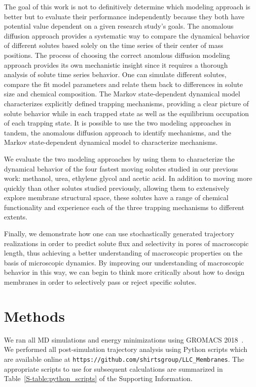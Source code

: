 \documentclass[journal=jctcce,manuscript=article]{achemso}
\begin{document}
  The goal of this work is not to definitively determine which modeling
  approach is better but to evaluate their performance independently because
  they both have potential value dependent on a given research study's goals.
  The anomalous diffusion approach provides a systematic way to compare the
  dynamical behavior of different solutes based solely on the time series of 
  their center of mass positions. The process of choosing the correct anomlous
  diffusion modeling approach provides its own mechanistic insight since it 
  requires a thorough analysis of solute time series behavior. One can simulate
  different solutes, compare the fit model parameters and relate them back to 
  differences in solute size and chemical composition. The Markov state-dependent
  dynamical model characterizes explicitly defined trapping mechanisms,
  providing a clear picture of solute behavior while in each trapped state as
  well as the equilibrium occupation of each trapping state.  It is possible to
  use the two modeling approaches in tandem, the anomalous diffusion approach to
  identify mechanisms, and the Markov state-dependent dynamical model to 
  characterize mechanisms. 
  
  We evaluate the two modeling approaches by using them to characterize the
  dynamical behavior of the four fastest moving solutes studied in our previous
  work: methanol, urea, ethylene glycol and acetic acid. In addition to moving
  more quickly than other solutes studied previously, allowing them to extensively
  explore membrane structural space, these solutes have a range of chemical 
  functionality and experience each of the three trapping mechanisms to different extents.
  
  Finally, we demonstrate how one can use stochastically generated trajectory 
  realizations in order to predict solute flux and selectivity in pores of 
  macroscopic length, thus achieving a better understanding of macroscopic 
  properties on the basis of microscopic dynamics. By improving our 
  understanding of macroscopic behavior in this way, we can begin to think more
  critically about how to design membranes in order to selectively pass or 
  reject specific solutes.
    
  \section{Methods}
    
  We ran all MD simulations and energy minimizations using GROMACS
  2018~\cite{bekker_gromacs:_1993,berendsen_gromacs:_1995,van_der_spoel_gromacs:_2005,hess_gromacs_2008}.
  We performed all post-simulation trajectory analysis using Python scripts
  which are available online at
  \texttt{https://github.com/shirtsgroup/LLC\_Membranes}. The appropriate
  scripts to use for subsequent calculations are summarized in
  Table~\ref{S-table:python_scripts} of the Supporting Information.
  
\end{document}
